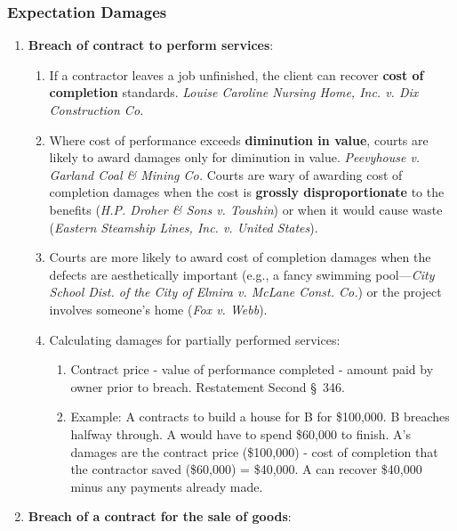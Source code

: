 \subsubsection{Expectation Damages}

\begin{enumerate}
    \item \textbf{Breach of contract to perform services}:
    \begin{enumerate}
        \item If a contractor leaves a job unfinished, the client can recover 
        \textbf{cost of completion} standards. \emph{Louise Caroline Nursing 
        Home, Inc. v. Dix Construction Co.}
        \item Where cost of performance exceeds \textbf{diminution in value}, 
        courts are likely to award damages only for diminution in value.  
        \emph{Peevyhouse v. Garland Coal \& Mining Co.} Courts are wary of 
        awarding cost of completion damages when the cost is \textbf{grossly 
        disproportionate} to the benefits (\emph{H.P. Droher \& Sons v. 
        Toushin}) or when it would cause waste (\emph{Eastern Steamship Lines, 
        Inc. v.  United States}).
        \item Courts are more likely to award cost of completion damages when 
        the defects are aesthetically important (e.g., a fancy swimming 
        pool---\emph{City School Dist. of the City of Elmira v.  McLane Const.  
        Co.}) or the project involves someone's home (\emph{Fox v. Webb}).  
        \item Calculating damages for partially performed services:
        \begin{enumerate}
            \item Contract price - value of performance completed - amount 
            paid by owner prior to breach. Restatement Second \S\ 346.
            \item Example: A contracts to build a house for B for \$100,000. B 
            breaches halfway through. A would have to spend \$60,000 to 
            finish.  A's damages are the contract price (\$100,000) - cost of 
            completion that the contractor saved (\$60,000) = \$40,000. A can 
            recover \$40,000 minus any payments already made.
        \end{enumerate}
    \end{enumerate}
    \item \textbf{Breach of a contract for the sale of goods}:
    \begin{enumerate}

\end{enumerate}
\end{enumerate}

